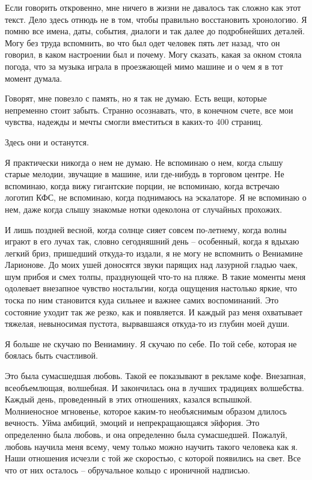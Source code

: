 \documentclass[
]{book}
\begin{document}
Если говорить откровенно, мне ничего в жизни не давалось так сложно как этот текст. Дело здесь отнюдь не в том, чтобы правильно восстановить хронологию. Я помню все имена, даты, события, диалоги и так далее до подробнейших деталей. Могу без труда вспомнить, во что был одет человек пять лет назад, что он говорил, в каком настроении был и почему. Могу сказать, какая за окном стояла погода, что за музыка играла в проезжающей мимо машине и о чем я в тот момент думала.

Говорят, мне повезло с память, но я так не думаю. Есть вещи, которые непременно стоит забыть. Странно осознавать, что, в конечном счете, все мои чувства, надежды и мечты смогли вместиться в каких-то 400 страниц.

Здесь они и останутся.

Я практически никогда о нем не думаю. Не вспоминаю о нем, когда слышу старые мелодии, звучащие в машине, или где-нибудь в торговом центре. Не вспоминаю, когда вижу гигантские порции, не вспоминаю, когда встречаю логотип КФС, не вспоминаю, когда поднимаюсь на эскалаторе. Я не вспоминаю о нем, даже когда слышу знакомые нотки одеколона от случайных прохожих.

И лишь поздней весной, когда солнце сияет совсем по-летнему, когда волны играют в его лучах так, словно сегодняшний день -- особенный, когда я вдыхаю легкий бриз, пришедший откуда-то издали, я не могу не вспомнить о Вениамине Ларионове. До моих ушей доносятся звуки парящих над лазурной гладью чаек, шум прибоя и смех толпы, празднующей что-то на пляже. В такие моменты меня одолевает внезапное чувство ностальгии, когда ощущения настолько яркие, что тоска по ним становится куда сильнее и важнее самих воспоминаний. Это состояние уходит так же резко, как и появляется. И каждый раз меня охватывает тяжелая, невыносимая пустота, вырвавшаяся откуда-то из глубин моей души.

Я больше не скучаю по Вениамину. Я скучаю по себе. По той себе, которая не боялась быть счастливой.

Это была сумасшедшая любовь. Такой ее показывают в рекламе кофе. Внезапная, всеобъемлющая, волшебная. И закончилась она в лучших традициях волшебства. Каждый день, проведенный в этих отношениях, казался вспышкой. Молниеносное мгновенье, которое каким-то необъяснимым образом длилось вечность. Уйма амбиций, эмоций и непрекращающаяся эйфория. Это определенно была любовь, и она определенно была сумасшедшей. Пожалуй, любовь научила меня всему, чему только можно научить такого человека как я. Наши отношения исчезли с той же скоростью, с которой появились на свет. Все что от них осталось -- обручальное кольцо с ироничной надписью.
\end{document}
